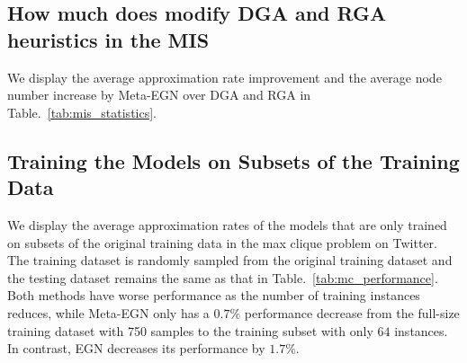 \subsection{How much does \proj modify DGA and RGA heuristics in the MIS}
We display the average approximation rate improvement and the average node number increase by Meta-EGN over DGA and RGA in Table.~\ref{tab:mis_statistics}.
\begin{table}[h]
\caption{Improvement of \proj over DGA and RGA in the MIS on RRGs, `Imp in ApR' denotes the average improvement in approximation rate, and `Imp in $\#$Node' denotes the average number of nodes that \proj could find more than the heuristics.}
\label{tab:mis_statistics}
\vspace{-0.3cm}
\end{table}

\subsection{Training the Models on Subsets of the Training Data}
We display the average approximation rates of the models that are only trained on subsets of the original training data in the max clique problem on Twitter. The training dataset is randomly sampled from the original training dataset and the testing dataset remains the same as that in Table.~\ref{tab:mc_performance}. Both methods have worse performance as the number of training instances reduces, while Meta-EGN only has a $0.7\%$ performance decrease from the full-size training dataset with 750 samples to the training subset with only $64$ instances. In contrast, EGN decreases its performance by $1.7\%$.


